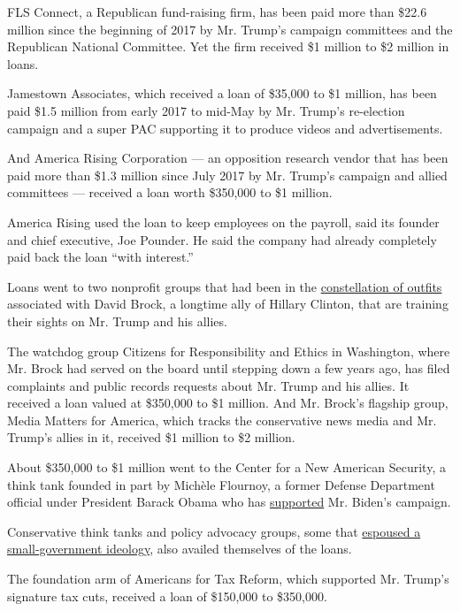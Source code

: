 FLS Connect, a Republican fund-raising firm, has been paid more than
\$22.6 million since the beginning of 2017 by Mr. Trump's campaign
committees and the Republican National Committee. Yet the firm received
\$1 million to \$2 million in loans.

Jamestown Associates, which received a loan of \$35,000 to \$1 million,
has been paid \$1.5 million from early 2017 to mid-May by Mr. Trump's
re-election campaign and a super PAC supporting it to produce videos and
advertisements.

And America Rising Corporation --- an opposition research vendor that
has been paid more than \$1.3 million since July 2017 by Mr. Trump's
campaign and allied committees --- received a loan worth \$350,000 to
\$1 million.

America Rising used the loan to keep employees on the payroll, said its
founder and chief executive, Joe Pounder. He said the company had
already completely paid back the loan ``with interest.''

Loans went to two nonprofit groups that had been in the
\href{https://www.politico.com/story/2014/08/david-brock-citizens-for-responsibility-and-ethics-in-washington-110003}{constellation
of outfits} associated with David Brock, a longtime ally of Hillary
Clinton, that are training their sights on Mr. Trump and his allies.

The watchdog group Citizens for Responsibility and Ethics in Washington,
where Mr. Brock had served on the board until stepping down a few years
ago, has filed complaints and public records requests about Mr. Trump
and his allies. It received a loan valued at \$350,000 to \$1 million.
And Mr. Brock's flagship group, Media Matters for America, which tracks
the conservative news media and Mr. Trump's allies in it, received \$1
million to \$2 million.

About \$350,000 to \$1 million went to the Center for a New American
Security, a think tank founded in part by Michèle Flournoy, a former
Defense Department official under President Barack Obama who has
\href{https://www.defenseone.com/ideas/2020/06/we-need-joe-biden/166033/}{supported}
Mr. Biden's campaign.

Conservative think tanks and policy advocacy groups, some that
\href{https://www.nytimes.com/2020/04/24/us/politics/coronavirus-bailouts-conservative-liberal.html}{espoused
a small-government ideology}, also availed themselves of the loans.

The foundation arm of Americans for Tax Reform, which supported Mr.
Trump's signature tax cuts, received a loan of \$150,000 to \$350,000.

